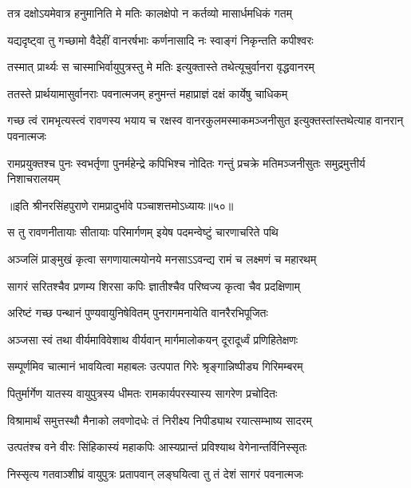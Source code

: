 \twolineshloka
{तत्र दक्षोऽयमेवात्र हनुमानिति मे मतिः}
{कालक्षेपो न कर्तव्यो मासार्धमधिकं गतम्} %

\twolineshloka
{यद्यदृष्ट्वा तु गच्छामो वैदेहीं वानरर्षभाः}
{कर्णनासादि नः स्वाङ्गं निकृन्तति कपीश्वरः} %

\twolineshloka
{तस्मात् प्रार्थ्यः स चास्माभिर्वायुपुत्रस्तु मे मतिः}
{इत्युक्तास्ते तथेत्यूचुर्वानरा वृद्धवानरम्} %

\twolineshloka
{ततस्ते प्रार्थयामासुर्वानराः पवनात्मजम्}
{हनुमन्तं महाप्राज्ञं दक्षं कार्येषु चाधिकम्} %

\threelineshloka
{गच्छ त्वं रामभृत्यस्त्वं रावणस्य भयाय च}
{रक्षस्व वानरकुलमस्माकमञ्जनीसुत}
{इत्युक्तस्तांस्तथेत्याह वानरान् पवनात्मजः} %

\fourlineindentedshloka
{रामप्रयुक्तश्च पुनः स्वभर्तृणा}
{पुनर्महेन्द्रे कपिभिश्च नोदितः}
{गन्तुं प्रचक्रे मतिमञ्जनीसुतः}
{समुद्रमुत्तीर्य निशाचरालयम्} %

॥इति श्रीनरसिंहपुराणे रामप्रादुर्भावे पञ्चाशत्तमोऽध्यायः॥५०॥



\twolineshloka
{स तु रावणनीतायाः सीतायाः परिमार्गणम्}
{इयेष पदमन्वेष्टुं चारणाचरिते पथि} %

\twolineshloka
{अञ्जलिं प्राङ्मुखं कृत्वा सगणायात्मयोनये}
{मनसाऽऽवन्द्य रामं च लक्ष्मणं च महारथम्} %

\twolineshloka
{सागरं सरितश्चैव प्रणम्य शिरसा कपिः}
{ज्ञातीश्चैव परिष्वज्य कृत्वा चैव प्रदक्षिणाम्} %

\twolineshloka
{अरिष्टं गच्छ पन्थानं पुण्यवायुनिषेवितम्}
{पुनरागमनायेति वानरैरभिपूजितः} %

\twolineshloka
{अञ्जसा स्वं तथा वीर्यमाविवेशाथ वीर्यवान्}
{मार्गमालोकयन् दूरादूर्ध्वं प्रणिहितेक्षणः} %

\twolineshloka
{सम्पूर्णमिव चात्मानं भावयित्वा महाबलः}
{उत्पपात गिरेः श्रृङ्गान्निष्पीड्य गिरिमम्बरम्} %

\twolineshloka
{पितुर्मार्गेण यातस्य वायुपुत्रस्य धीमतः}
{रामकार्यपरस्यास्य सागरेण प्रचोदितः} %

\twolineshloka
{विश्रामार्थं समुत्तस्थौ मैनाको लवणोदधेः}
{तं निरीक्ष्य निपीड्याथ रयात्सम्भाष्य सादरम्} %

\twolineshloka
{उत्पतंश्च वने वीरः सिंहिकास्यं महाकपिः}
{आस्यप्रान्तं प्रविश्याथ वेगेनान्तर्विनिस्सृतः} %

\twolineshloka
{निस्सृत्य गतवाञ्शीघ्रं वायुपुत्रः प्रतापवान्}
{लङ्घयित्वा तु तं देशं सागरं पवनात्मजः} %

